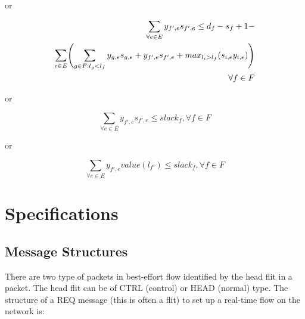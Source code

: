 \documentclass[conference, twocolumn]{IEEEtran}
\theoremstyle{definition}
\begin{document}
or

\begin{eqnarray}\label{equ:e2eDelayModificatio2}
\sum_{\forall e \in E}y_{f',e}s_{f',e} \leq d_f-s_f + 1 - \notag \\ 
\sum_{e \in E} \Biggl(\sum_{g \in F:l_g <
l_f}y_{g,e}s_{g,e}+y_{f',e}s_{f',e}+max_{l_i>l_f}(s_{i,e}y_{i,e})\Biggr) \notag
\\ \forall f \in F
\end{eqnarray}

or

\begin{equation}\label{equ:e2eDelayModificatio3}
\sum_{\forall e \in E}y_{f',e}s_{f',e} \leq slack_f, \forall f \in F
\end{equation}

or

\begin{equation}\label{equ:e2eDelayModificatio4}
\sum_{\forall e \in E}y_{f',e}value(l_{f'}) \leq slack_f, \forall f \in F
\end{equation}

\section{Specifications}
\subsection{Message Structures}

There are two type of packets in best-effort flow identified by the head flit
in a packet. The head flit can be of CTRL (control) or HEAD (normal) type. The
structure of a REQ message (this is often a flit) to set up a real-time flow on the network is:

\begin{table}[htbp]
\begin{center}
\end{center}
\caption{REQ path message}
\label{table:PathMsg}
\end{table}
\end{document}
